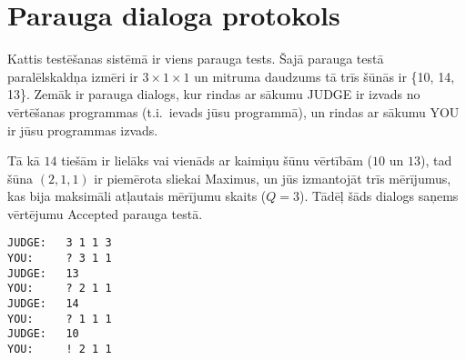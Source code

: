 \section*{Parauga dialoga protokols}
Kattis testēšanas sistēmā ir viens parauga tests.
Šajā parauga testā paralēlskaldņa izmēri ir $3\times 1\times 1$ un mitruma daudzums tā trīs šūnās ir \{10, 14, 13\}.
Zemāk ir parauga dialogs, kur rindas ar sākumu JUDGE ir izvads no vērtēšanas programmas (t.i.\ ievads jūsu programmā), un rindas ar sākumu YOU ir jūsu programmas izvads.

Tā kā $14$ tiešām ir lielāks vai vienāds ar kaimiņu šūnu vērtībām ($10$ un $13$), tad šūna $(2,1,1)$ ir piemērota sliekai Maximus,
un jūs izmantojāt trīs mērījumus, kas bija maksimāli atļautais mērījumu skaits ($Q=3$). Tādēļ šāds dialogs saņems vērtējumu Accepted parauga testā.

\begin{verbatim}
JUDGE:   3 1 1 3
YOU:     ? 3 1 1
JUDGE:   13
YOU:     ? 2 1 1
JUDGE:   14
YOU:     ? 1 1 1
JUDGE:   10
YOU:     ! 2 1 1
\end{verbatim}
